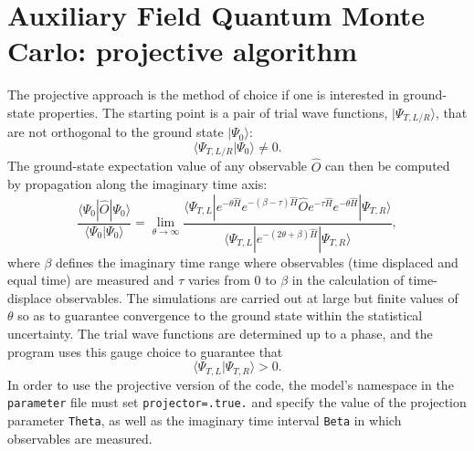 

\section{Auxiliary Field Quantum Monte Carlo: projective algorithm}\label{sec:defT0}

The projective approach is the method of choice if  one is interested in ground-state properties.  The starting point is a pair of trial wave functions,  $| \Psi_{T,L/R} \rangle $, that are  not orthogonal to the ground state $| \Psi_0 \rangle $:
\begin{equation}
  \langle \Psi_{T,L/R}  | \Psi_0 \rangle  \neq 0. 
\end{equation}
The ground-state expectation value of  any  observable  $\hat{O} $ can then be computed by  propagation along the imaginary time axis:
  \begin{equation}
	 \frac{ \langle \Psi_0 | \hat{O} | \Psi_0 \rangle }{ \langle \Psi_0 | \Psi_0 \rangle}   = \lim_{\theta \rightarrow \infty}  
	 \frac{ \langle \Psi_{T,L} | e^{-\theta \hat{H}}  e^{-(\beta - \tau)\hat{H}  }\hat{O} e^{- \tau  \hat{H} }   e^{-\theta \hat{H}} | \Psi_{T,R} \rangle } 
	        { \langle \Psi_{T,L} | e^{-(2 \theta + \beta) \hat{H}  } | \Psi_{T,R} \rangle } ,
\end{equation}
where $\beta$ defines the imaginary time range where observables (time displaced and equal time) are measured and $\tau$ varies from $0$ to $\beta$ in the calculation of time-displace observables.
The simulations are carried out at large  but finite values of  $\theta$ so as to guarantee convergence to the ground  state within the statistical uncertainty.
The trial wave functions are determined up to a phase, and the program uses this gauge choice to  guarantee that
\begin{equation}
	 \langle \Psi_{T,L} | \Psi_{T,R} \rangle  > 0.
\end{equation}
In order to use the projective version of the code, the model's namespace in the \texttt{parameter} file must set \texttt{projector=.true.} and specify the value of the projection parameter \texttt{Theta}, as well as the imaginary time interval \texttt{Beta} in which observables are measured.

